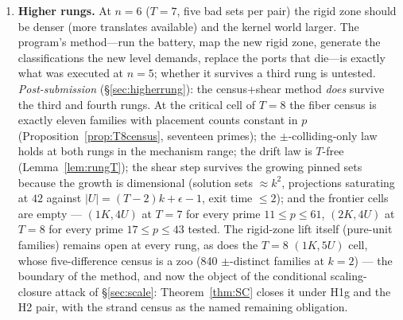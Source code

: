 \documentclass[11pt,a4paper]{article}
\numberwithin{equation}{section}
\theoremstyle{plain}
\theoremstyle{plain}
\theoremstyle{definition}
\theoremstyle{remark}
\begin{document}
\begin{enumerate}[leftmargin=1.7em,itemsep=4pt]
\item \textbf{Higher rungs.} At $n=6$ ($T=7$, five bad sets per pair) the
  rigid zone should be denser (more translates available) and the kernel
  world larger. The program's method---run the battery, map the new
  rigid zone, generate the classifications the new level demands, replace
  the ports that die---is exactly what was executed at $n=5$; whether it
  survives a third rung is untested. \emph{Post-submission}
  (\S\ref{sec:higherrung}): the census+shear method \emph{does} survive
  the third and fourth rungs. At the critical cell of $T=8$ the fiber
  census is exactly eleven families with placement counts constant in
  $p$ (Proposition~\ref{prop:T8census}, seventeen primes); the
  $\pm$-colliding-only law holds at both rungs in the mechanism range;
  the drift law is $T$-free (Lemma~\ref{lem:rungT}); the shear step
  survives the growing pinned sets because the growth is dimensional
  (solution sets $\approx k^2$, projections saturating at $42$ against
  $|U|=(T-2)k+\epsilon-1$, exit time $\le2$); and the frontier cells are
  empty --- $(1K,4U)$ at $T=7$ for every prime $11\le p\le61$, $(2K,4U)$
  at $T=8$ for every prime $17\le p\le43$ tested. The rigid-zone lift
  itself (pure-unit families) remains open at every rung, as does the
  $T=8$ $(1K,5U)$ cell, whose five-difference census is a zoo (840
  $\pm$-distinct families at $k=2$) --- the boundary of the method,
  and now the object of the conditional scaling-closure attack of
  \S\ref{sec:scale}: Theorem~\ref{thm:SC} closes it under H1g and the
  H2 pair, with the strand census as the named remaining obligation.


\end{enumerate}
\end{document}
